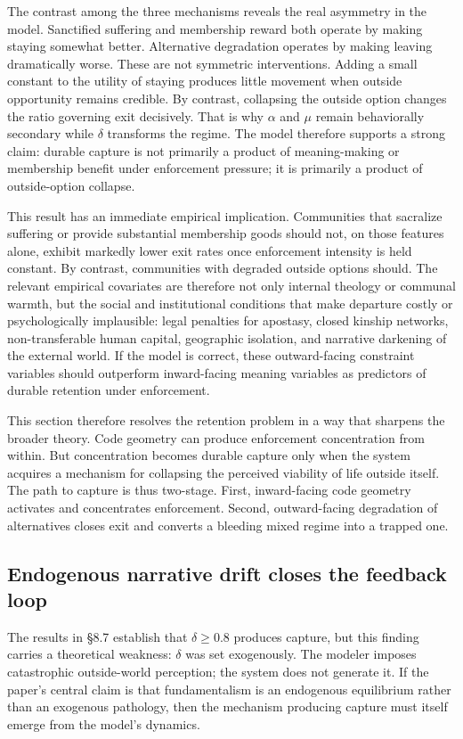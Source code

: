 \documentclass[12pt]{article}
\begin{document}
The contrast among the three mechanisms reveals the real asymmetry in the model. Sanctified suffering and membership reward both operate by making staying somewhat better. Alternative degradation operates by making leaving dramatically worse. These are not symmetric interventions. Adding a small constant to the utility of staying produces little movement when outside opportunity remains credible. By contrast, collapsing the outside option changes the ratio governing exit decisively. That is why $\alpha$ and $\mu$ remain behaviorally secondary while $\delta$ transforms the regime. The model therefore supports a strong claim: durable capture is not primarily a product of meaning-making or membership benefit under enforcement pressure; it is primarily a product of outside-option collapse.

This result has an immediate empirical implication. Communities that sacralize suffering or provide substantial membership goods should not, on those features alone, exhibit markedly lower exit rates once enforcement intensity is held constant. By contrast, communities with degraded outside options should. The relevant empirical covariates are therefore not only internal theology or communal warmth, but the social and institutional conditions that make departure costly or psychologically implausible: legal penalties for apostasy, closed kinship networks, non-transferable human capital, geographic isolation, and narrative darkening of the external world. If the model is correct, these outward-facing constraint variables should outperform inward-facing meaning variables as predictors of durable retention under enforcement.

This section therefore resolves the retention problem in a way that sharpens the broader theory. Code geometry can produce enforcement concentration from within. But concentration becomes durable capture only when the system acquires a mechanism for collapsing the perceived viability of life outside itself. The path to capture is thus two-stage. First, inward-facing code geometry activates and concentrates enforcement. Second, outward-facing degradation of alternatives closes exit and converts a bleeding mixed regime into a trapped one.

\subsection{Endogenous narrative drift closes the feedback loop}

The results in \S8.7 establish that $\delta \geq 0.8$ produces capture, but this finding carries a theoretical weakness: $\delta$ was set exogenously. The modeler imposes catastrophic outside-world perception; the system does not generate it. If the paper's central claim is that fundamentalism is an endogenous equilibrium rather than an exogenous pathology, then the mechanism producing capture must itself emerge from the model's dynamics.
\end{document}
